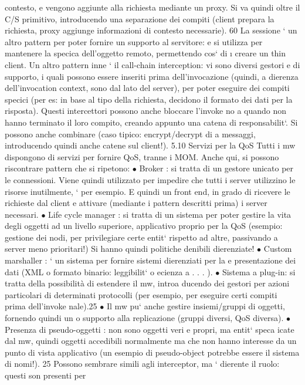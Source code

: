 \documentclass[a4paper,12pt]{article}
\begin{document}
contesto, e vengono aggiunte alla richiesta mediante un proxy. Si va quindi
oltre il C/S primitivo, introducendo una separazione dei compiti (client prepara
la richiesta, proxy aggiunge informazioni di contesto necessarie).
60
\newpage
La sessione ` un altro pattern per poter fornire un supporto al servitore:
e
si utilizza per mantenere la specica dell'oggetto remoto, permettendo cos` di
\i{}
creare un thin client.
Un altro pattern inne ` il call-chain interception: vi sono diversi gestori
e
di supporto, i quali possono essere inseriti prima dell'invocazione (quindi, a
dierenza dell'invocation context, sono dal lato del server), per poter eseguire
dei compiti specici (per es: in base al tipo della richiesta, decidono il formato
dei dati per la risposta). Questi intercettori possono anche bloccare l'invoke no
a quando non hanno terminato il loro compito, creando appunto una catena di
responsabilit`. Si possono anche combinare (caso tipico: encrypt/decrypt di
a
messaggi, introducendo quindi anche catene sul client!).
5.10
Servizi per la QoS
Tutti i mw dispongono di servizi per fornire QoS, tranne i MOM. Anche qui, si
possono riscontrare pattern che si ripetono:
$\bullet$ Broker : si tratta di un gestore unicato per le connessioni. Viene quindi
utilizzato per impedire che tutti i server utilizzino le risorse inutilmente,
`
per esempio. E quindi un front end, in grado di ricevere le richieste dal
client e attivare (mediante i pattern descritti prima) i server necessari.
$\bullet$ Life cycle manager : si tratta di un sistema per poter gestire la vita degli
oggetti ad un livello superiore, applicativo proprio per la QoS (esempio:
gestione dei nodi, per privilegiare certe entit` rispetto ad altre, passivando
a
server meno prioritari!) Si hanno quindi politiche denibili dierenziate!
$\bullet$ Custom marshaller : ` un sistema per fornire sistemi dierenziati per la
e
presentazione dei dati (XML o formato binario: leggibilit` o ecienza
a
. . . ).
$\bullet$ Sistema a plug-in: si tratta della possibilità di estendere il mw, introa
ducendo dei gestori per azioni particolari di determinati protocolli (per
esempio, per eseguire certi compiti prima dell'invoke nale).25
$\bullet$ Il mw pu` anche gestire insiemi/gruppi di oggetti, fornendo quindi un
o
supporto alla replicazione (gruppi diversi, QoS diversa).
$\bullet$ Presenza di pseudo-oggetti : non sono oggetti veri e propri, ma entit` speca
icate dal mw, quindi oggetti accedibili normalmente ma che non hanno
interesse da un punto di vista applicativo (un esempio di pseudo-object
potrebbe essere il sistema di nomi!).
25 Possono sembrare simili agli interceptor, ma ` dierente il ruolo: questi son presenti per
\end{document}
